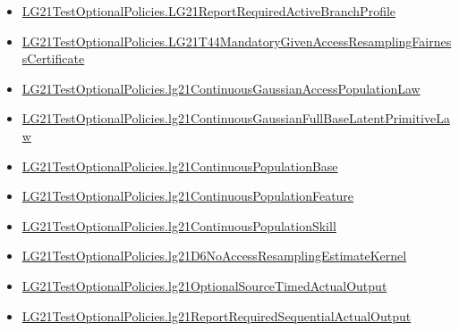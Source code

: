 \documentclass[10pt]{article}
\begin{document}
\begin{itemize}
\item \hyperlink{governing-declaration-a4ca58af5822aaeb}{LG21\allowbreak{}Test\allowbreak{}Optional\allowbreak{}Policies.\allowbreak{}LG21\allowbreak{}Report\allowbreak{}Required\allowbreak{}Active\allowbreak{}Branch\allowbreak{}Profile}
\item \hyperlink{governing-declaration-f0870993f14d33a8}{LG21\allowbreak{}Test\allowbreak{}Optional\allowbreak{}Policies.\allowbreak{}LG21\allowbreak{}T44\allowbreak{}Mandatory\allowbreak{}Given\allowbreak{}Access\allowbreak{}Resampling\allowbreak{}Fairness\allowbreak{}Certificate}
\item \hyperlink{governing-declaration-fa49b6c4b938413f}{LG21\allowbreak{}Test\allowbreak{}Optional\allowbreak{}Policies.\allowbreak{}lg21\allowbreak{}Continuous\allowbreak{}Gaussian\allowbreak{}Access\allowbreak{}Population\allowbreak{}Law}
\item \hyperlink{governing-declaration-20f56d0090cb85ed}{LG21\allowbreak{}Test\allowbreak{}Optional\allowbreak{}Policies.\allowbreak{}lg21\allowbreak{}Continuous\allowbreak{}Gaussian\allowbreak{}Full\allowbreak{}Base\allowbreak{}Latent\allowbreak{}Primitive\allowbreak{}Law}
\item \hyperlink{governing-declaration-3b5146b167dee236}{LG21\allowbreak{}Test\allowbreak{}Optional\allowbreak{}Policies.\allowbreak{}lg21\allowbreak{}Continuous\allowbreak{}Population\allowbreak{}Base}
\item \hyperlink{governing-declaration-f07391974a356bb7}{LG21\allowbreak{}Test\allowbreak{}Optional\allowbreak{}Policies.\allowbreak{}lg21\allowbreak{}Continuous\allowbreak{}Population\allowbreak{}Feature}
\item \hyperlink{governing-declaration-339ce55dcb78dfb9}{LG21\allowbreak{}Test\allowbreak{}Optional\allowbreak{}Policies.\allowbreak{}lg21\allowbreak{}Continuous\allowbreak{}Population\allowbreak{}Skill}
\item \hyperlink{governing-declaration-5a7f43c63ba4d43f}{LG21\allowbreak{}Test\allowbreak{}Optional\allowbreak{}Policies.\allowbreak{}lg21\allowbreak{}D6\allowbreak{}No\allowbreak{}Access\allowbreak{}Resampling\allowbreak{}Estimate\allowbreak{}Kernel}
\item \hyperlink{governing-declaration-d65503c7a908c20a}{LG21\allowbreak{}Test\allowbreak{}Optional\allowbreak{}Policies.\allowbreak{}lg21\allowbreak{}Optional\allowbreak{}Source\allowbreak{}Timed\allowbreak{}Actual\allowbreak{}Output}
\item \hyperlink{governing-declaration-44fa832554c59dfe}{LG21\allowbreak{}Test\allowbreak{}Optional\allowbreak{}Policies.\allowbreak{}lg21\allowbreak{}Report\allowbreak{}Required\allowbreak{}Sequential\allowbreak{}Actual\allowbreak{}Output}
\end{itemize}
\end{document}
